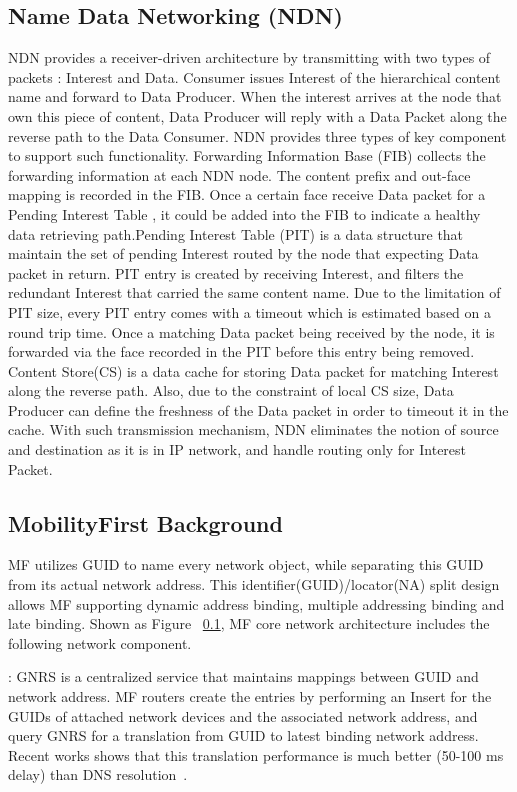 \subsection{Name Data Networking (NDN)}
NDN provides a receiver-driven architecture by transmitting with two types of packets : Interest and Data. Consumer issues Interest of the hierarchical content name and forward to Data Producer. When the interest arrives at the node that own this piece of content, Data Producer will reply with a Data Packet along the reverse path to the Data Consumer. NDN provides three types of key component to support such functionality. Forwarding Information Base (FIB) collects the forwarding information at each NDN node. The content prefix and out-face mapping is recorded in the FIB. Once a certain face receive Data packet for a Pending Interest Table , it could be added into the FIB to indicate a healthy data retrieving path.Pending Interest Table (PIT) is a data structure that maintain the set of pending Interest routed by the node that expecting Data packet in return. PIT entry is created by receiving Interest, and filters the redundant Interest that carried the same content name. Due to the limitation of PIT size, every PIT entry comes with a timeout which is estimated based on a round trip time. Once a matching Data packet being received by the node, it is forwarded via the face recorded in the PIT before this entry being removed. Content Store(CS) is a data cache for storing Data packet for matching Interest along the reverse path. Also, due to the constraint of local CS size, Data Producer can define the freshness of the Data packet in order to timeout it in the cache. With such transmission mechanism, NDN eliminates the notion of source and destination as it is in IP network, and handle routing only for Interest Packet.

\subsection{MobilityFirst Background}\label{sec:intro_mf}
MF utilizes GUID to name every network object, while separating this GUID from its actual network address. This identifier(GUID)/locator(NA) split design allows MF supporting dynamic address binding, multiple addressing binding and late binding. Shown as Figure ~\ref{}, MF core network architecture includes the following network component.

\vspace{1mm}: GNRS is a centralized service that maintains mappings between GUID and network address. MF routers create the entries by performing an Insert for the GUIDs of attached network devices and the associated network address, and query GNRS for a translation from GUID to latest binding network address. Recent works shows that this translation performance is much better (50-100 ms delay) than DNS resolution~\cite{vu2012dmap}.

